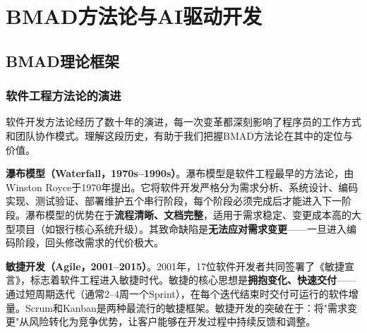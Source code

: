 
\chapter{BMAD方法论与AI驱动开发}


\section{BMAD理论框架}

\subsection{软件工程方法论的演进}

软件开发方法论经历了数十年的演进，每一次变革都深刻影响了程序员的工作方式和团队协作模式。理解这段历史，有助于我们把握BMAD方法论在其中的定位与价值。

\textbf{瀑布模型（Waterfall，1970s--1990s）}。瀑布模型是软件工程最早的方法论，由Winston Royce于1970年提出。它将软件开发严格分为需求分析、系统设计、编码实现、测试验证、部署维护五个串行阶段，每个阶段必须完成后才能进入下一阶段。瀑布模型的优势在于\textbf{流程清晰、文档完整}，适用于需求稳定、变更成本高的大型项目（如银行核心系统升级）。其致命缺陷是\textbf{无法应对需求变更}——一旦进入编码阶段，回头修改需求的代价极大。

\textbf{敏捷开发（Agile，2001--2015）}。2001年，17位软件开发者共同签署了《敏捷宣言》，标志着软件工程进入敏捷时代。敏捷的核心思想是\textbf{拥抱变化、快速交付}——通过短周期迭代（通常2--4周一个Sprint），在每个迭代结束时交付可运行的软件增量。Scrum和Kanban是两种最流行的敏捷框架。敏捷开发的突破在于：将"需求变更"从风险转化为竞争优势，让客户能够在开发过程中持续反馈和调整。

